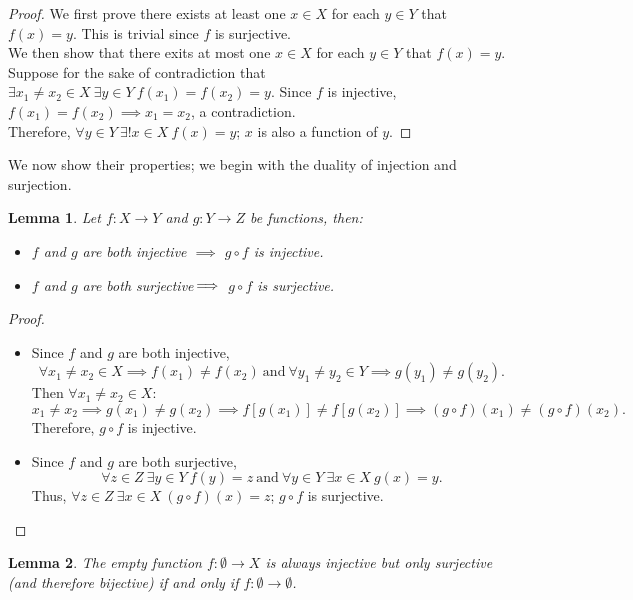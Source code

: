 \documentclass[a4paper]{book}
\newtheorem*{proof}{\textit{Proof.}}
\theoremstyle{break}
\newtheorem{lemma}{Lemma}[section]
\begin{document}
			\begin{proof}
				We first prove there exists at least one $x\in X$ for each $y\in Y$ that $f(x)=y$. This is trivial since $f$ is surjective.\\
				We then show that there exits at most one $x\in X$ for each $y\in Y$ that $f(x)=y$. Suppose for the sake of contradiction that $\exists x_1\neq x_2\in X~\exists y\in Y~f(x_1)=f(x_2)=y$. Since $f$ is injective, $f(x_1)=f(x_2)\implies x_1=x_2$, a contradiction.\\
				Therefore, $\forall y\in Y~\exists!x\in X~f(x)=y$; $x$ is also a function of $y$.
			\end{proof}
			We now show their properties; we begin with the duality of injection and surjection.
			\begin{lemma}
				\label{injective and surjective composition}
				Let $f:X\to Y$ and $g:Y\to Z$ be functions, then:
				\begin{itemize}
					\item $f$ and $g$ are both injective $\implies$ $g\circ f$ is injective.
					\item $f$ and $g$ are both surjective $\mspace{-9mu}\implies$ $g\circ f$ is surjective.
				\end{itemize}
			\end{lemma}
			\begin{proof}~
				\begin{itemize}
					\item Since $f$ and $g$ are both injective,
					$$\forall x_1\neq x_2\in X\implies f(x_1)\neq f(x_2)~\text{and}~\forall y_1\neq y_2\in Y\implies g(y_1)\neq g(y_2).$$
					Then $\forall x_1\neq x_2\in X$:
					$$x_1\neq x_2\implies g(x_1)\neq g(x_2)\implies f[g(x_1)]\neq f[g(x_2)]\implies (g\circ f)(x_1)\neq(g\circ f)(x_2).$$
					Therefore, $g\circ f$ is injective.
					\item Since $f$ and $g$ are both surjective,
					$$\forall z\in Z~\exists y\in Y~f(y)=z~\text{and}~\forall y\in Y~\exists x\in X~g(x)=y.$$
					Thus, $\forall z\in Z~\exists x\in X~(g\circ f)(x)=z$; $g\circ f$ is surjective.
				\end{itemize}
			\end{proof}
			\begin{lemma}
				The empty function $f:\emptyset\to X$ is always injective but only surjective (and therefore bijective) if and only if $f:\emptyset\to\emptyset$.
			\end{lemma}
\end{document}
